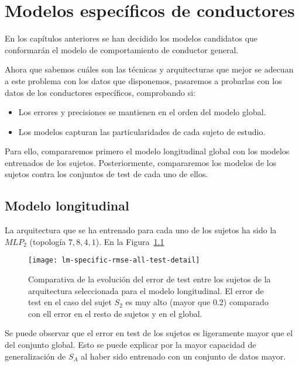 \chapter{Modelos específicos de conductores}
\label{ch:specific-models}

En los capítulos anteriores se han decidido los modelos candidatos que conformarán el modelo de comportamiento de conductor general.

Ahora que sabemos cuáles son las técnicas y arquitecturas que mejor se adecuan a este problema con los datos que disponemos, pasaremos a probarlas con los datos de los conductores específicos, comprobando si:

\begin{itemize}
	\item Los errores y precisiones se mantienen en el orden del modelo global.
	\item Los modelos capturan las particularidades de cada sujeto de estudio.
\end{itemize}

Para ello, compararemos primero el modelo longitudinal global con los modelos entrenados de los sujetos. Posteriormente, compararemos los modelos de los sujetos contra los conjuntos de test de cada uno de ellos.

\section{Modelo longitudinal}

La arquitectura que se ha entrenado para cada uno de los sujetos ha sido la $MLP_2$ (topología $7, 8, 4, 1$). En la Figura~\ref{fig:lm-specific-training-validation-and-test-comparison} 

\begin{figure}[!b]
	\centering
	\texttt{[image: lm-specific-rmse-all-test-detail]}
	\caption[Comparativa de la evolución del error de test entre los sujetos de la arquitectura seleccionada para el modelo longitudinal]{Comparativa de la evolución del error de test entre los sujetos de la arquitectura seleccionada para el modelo longitudinal. El error de test en el caso del sujet $S_2$ es muy alto (mayor que $0.2$) comparado con ell error en el resto de sujetos y en el global.}
	\label{fig:lm-specific-training-validation-and-test-comparison}
\end{figure}

Se puede observar que el error en test de los sujetos es ligeramente mayor que el del conjunto global. Esto se puede explicar por la mayor capacidad de generalización de $S_A$ al haber sido entrenado con un conjunto de datos mayor.

